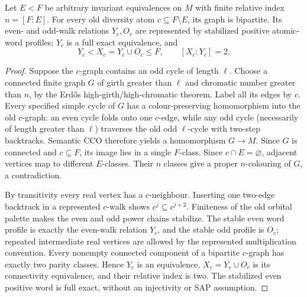 \begin{lemma}
\label{lem:ep-ap-orbital-parity}
Let $E<F$ be arbitrary invariant equivalences on $M$ with finite
relative index $n=[F:E]$. For every old diversity atom
$c\subseteq F\setminus E$, its graph is bipartite. Its even- and
odd-walk relations $Y_c,O_c$ are represented by stabilized positive
atomic-word profiles; $Y_c$ is a full exact equivalence, and
\[
 Y_c<X_c=Y_c\cup O_c\le F,
 \qquad [X_c:Y_c]=2.
\]
\end{lemma}
\begin{proof}
Suppose the $c$-graph contains an odd cycle of length $\ell$.
Choose a connected finite graph $G$ of girth greater than $\ell$
and chromatic number greater than $n$, by the Erd\H{o}s
high-girth/high-chromatic theorem. Label all its edges by $c$.
Every specified simple cycle of $G$ has a colour-preserving
homomorphism into the old $c$-graph: an even cycle folds onto one
$c$-edge, while any odd cycle (necessarily of length greater than
$\ell$) traverses the old odd $\ell$-cycle with two-step
backtracks. Semantic CCO therefore yields a homomorphism $G\to M$.
Since $G$ is connected and $c\subseteq F$, its image lies in a
single $F$-class. Since $c\cap E=\varnothing$, adjacent vertices
map to different $E$-classes. Their $n$ classes give a proper
$n$-colouring of $G$, a contradiction.

By transitivity every real vertex has a $c$-neighbour. Inserting
one two-edge backtrack in a represented $c$-walk shows
$c^j\subseteq c^{j+2}$. Finiteness of the old orbital palette
makes the even and odd power chains stabilize. The stable even
word profile is exactly the even-walk relation $Y_c$, and the
stable odd profile is $O_c$; repeated intermediate real vertices
are allowed by the represented multiplication convention.
Every nonempty connected component of a bipartite $c$-graph
has exactly two parity classes. Hence $Y_c$ is an equivalence,
$X_c=Y_c\cup O_c$ is its connectivity equivalence, and their
relative index is two. The stabilized even positive word is
full exact, without an injectivity or SAP assumption.
\end{proof}

